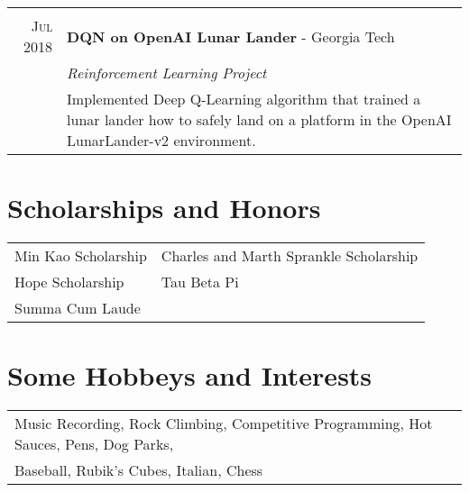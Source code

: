 \documentclass[a4paper,11pt]{article}
\begin{document}
\begin{tabularx}{\textwidth}{R|X}
    \\

   \textsc{Jul 2018} & \textbf{DQN on OpenAI Lunar Lander} \-- Georgia Tech\\
   & \emph{Reinforcement Learning Project}\\
   & \small{Implemented Deep Q-Learning algorithm that trained a lunar lander how to safely land on a platform in the OpenAI LunarLander-v2 environment.
   } \\
   

\end{tabularx}

\hfill
\section{Scholarships and Honors}
\begin{tabularx}{\textwidth}{XX}
   	Min Kao Scholarship & Charles and Marth Sprankle Scholarship \\
	Hope Scholarship & Tau Beta Pi \\
	Summa Cum Laude
\end{tabularx}
\hfill
\section{Some Hobbeys and Interests}
\begin{tabularx}{\textwidth}{lX}
	Music Recording, Rock Climbing, Competitive Programming, Hot Sauces, Pens, Dog Parks, \\
	Baseball, Rubik's Cubes, Italian, Chess
\end{tabularx}
\end{document}

